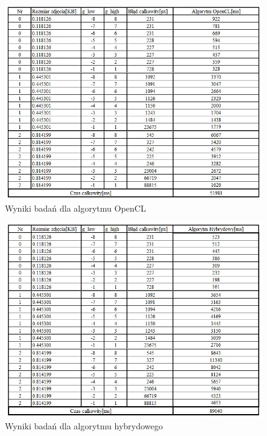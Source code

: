 \documentclass[document.tex]{subfiles}
\begin{document}
\begin{figure}[h]
\includegraphics[scale=0.75]{imgs/results_lap_gpu.jpg}
\caption{Wyniki badań dla algorytmu OpenCL}
\label{fig:results_lap_gpu}
\end{figure}

\begin{figure}[h]
\includegraphics[scale=0.75]{imgs/results_lap_hybrid.jpg}
\caption{Wyniki badań dla algorytmu hybrydowego}
\label{fig:results_lap_hybrid}
\end{figure}

\end{document}
